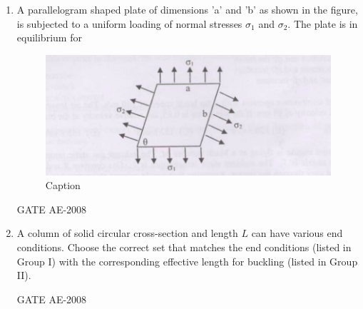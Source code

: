 \documentclass[journal,12pt,onecolumn]{IEEEtran}
\theoremstyle{remark}
\begin{document}
\begin{enumerate}
\item A parallelogram shaped plate of dimensions 'a' and 'b' as shown in the figure, is subjected to a uniform loading of normal stresses $\sigma_1$ and $\sigma_2$. The plate is in equilibrium for \\
\begin{figure}[H]
    \centering
    \includegraphics[width=0.5\linewidth]{figs/Screenshot from 2025-08-08 12-13-37.png}
    \caption{Caption}
    \label{fig:placeholder}
\end{figure}
\begin{enumerate}
\end{enumerate}
\hfill{GATE AE-2008}

    \quad

\item A column of solid circular cross-section and length $L$ can have various end conditions. Choose the correct set that matches the end conditions (listed in Group I) with the corresponding effective length for buckling (listed in Group II).

\begin{center}

\end{center}

\quad

\begin{enumerate}
\end{enumerate}
\hfill{GATE AE-2008}


\end{enumerate}
\end{document}
